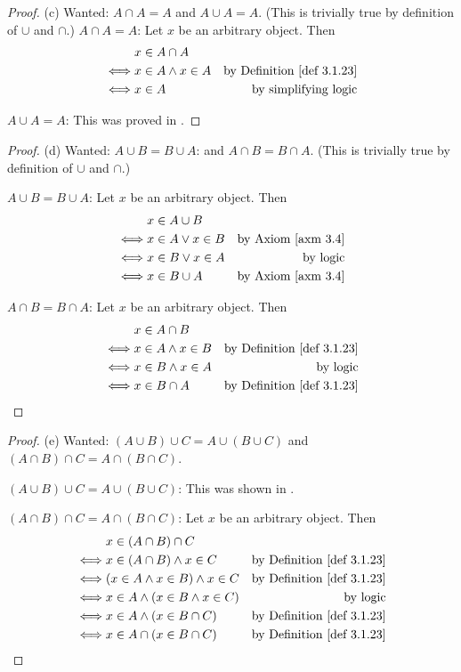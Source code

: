 \begin{proof}{(c)} Wanted: \(A \cap A = A\) and \(A \cup A = A\). (This is trivially true by definition of \(\cup\) and \(\cap\).)
\(A \cap A = A\): Let \(x\) be an arbitrary object. Then
\begin{align*}
         & x \in A \cap A \\
    \iff & x \in A \land x \in A & \text{by \DEF{3.1.23}} \\
    \iff & x \in A & \text{by simplifying logic}
\end{align*}

\(A \cup A = A\): This was proved in .
\end{proof}

\begin{proof}{(d)} Wanted: \(A \cup B = B \cup A\): and \(A \cap B = B \cap A\). (This is trivially true by definition of \(\cup\) and \(\cap\).)

\(A \cup B = B \cup A\): Let \(x\) be an arbitrary object. Then
\begin{align*}
         & x \in A \cup B \\
    \iff & x \in A \lor x \in B & \text{by \AXM{3.4}} \\
    \iff & x \in B \lor x \in A & \text{by logic} \\
    \iff & x \in B \cup A & \text{by \AXM{3.4}} \\
\end{align*}

\(A \cap B = B \cap A\): Let \(x\) be an arbitrary object. Then
\begin{align*}
         & x \in A \cap B \\
    \iff & x \in A \land x \in B & \text{by \DEF{3.1.23}} \\
    \iff & x \in B \land x \in A & \text{by logic} \\
    \iff & x \in B \cap A & \text{by \DEF{3.1.23}} \\
\end{align*}
\end{proof}


\begin{proof}{(e)} Wanted: \((A \cup B) \cup C = A \cup (B \cup C)\) and \((A \cap B) \cap C = A \cap (B \cap C)\).

\((A \cup B) \cup C = A \cup (B \cup C)\): This was shown in .

\((A \cap B) \cap C = A \cap (B \cap C)\): Let \(x\) be an arbitrary object. Then
\begin{align*}
         & x \in (A \cap B) \cap C \\
    \iff & x \in (A \cap B) \land x \in C & \text{by \DEF{3.1.23}} \\
    \iff & (x \in A \land x \in B) \land x \in C & \text{by \DEF{3.1.23}} \\
    \iff & x \in A \land (x \in B \land x \in C) & \text{by logic} \\
    \iff & x \in A \land (x \in B \cap C) & \text{by \DEF{3.1.23}} \\
    \iff & x \in A \cap (x \in B \cap C) & \text{by \DEF{3.1.23}} \\
\end{align*}
\end{proof}

